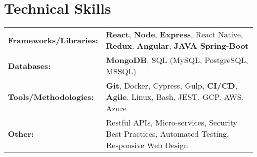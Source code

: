 \documentclass[a4paper,10pt]{article}  %
\begin{document}
\section{Technical Skills}
\begin{tabularx}{\linewidth}{@{}l X@{}}

\textbf{Frameworks/Libraries:} & \textbf{React}, \textbf{Node}, \textbf{Express}, React Native, \textbf{Redux}, \textbf{Angular}, \textbf{JAVA Spring-Boot} \\
\textbf{Databases:} & \textbf{MongoDB}, SQL (MySQL, PostgreSQL, MSSQL) \\
\textbf{Tools/Methodologies:} & \textbf{Git}, Docker, Cypress, Gulp, \textbf{CI/CD}, \textbf{Agile}, Linux, Bash, JEST, GCP, AWS, Azure \\ 
\textbf{Other:} & Restful APIs, Micro-services, Security Best Practices, Automated Testing, Responsive Web Design \\ 
\end{tabularx}

\vfill
\end{document}
